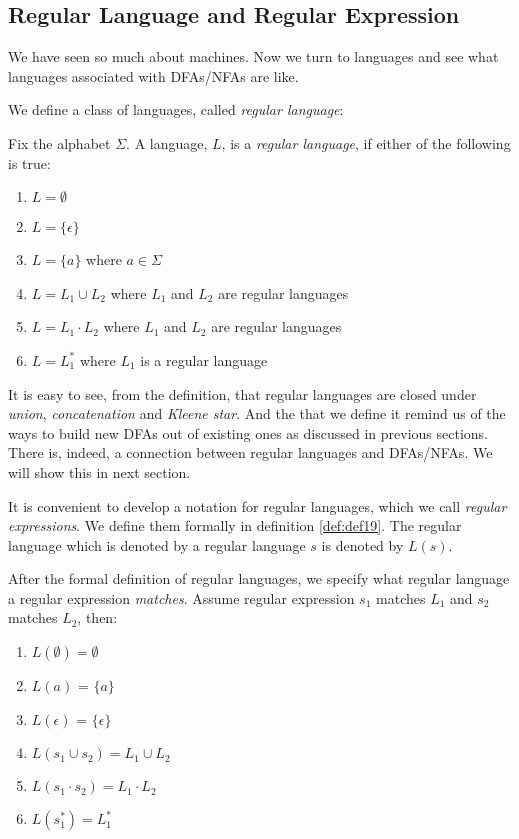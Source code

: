 \documentclass[11pt]{article}
\begin{document}
\subsection{Regular Language and Regular Expression}

We have seen so much about machines. Now we turn to languages and see what
languages associated with DFAs/NFAs are like.

We define a class of languages, called \emph{regular language}:
\begin{definition}
Fix the alphabet $\Sigma$. A language, $L$, is a \emph{regular language},
if either of the following is true:
\begin{enumerate}
\item $L = \emptyset$
\item $L = \{\epsilon\}$
\item $L = \{a\}$ where $a \in \Sigma$
\item $L = L_1 \cup L_2$ where $L_1$ and $L_2$ are regular languages
\item $L = L_1 \cdot L_2$ where $L_1$ and $L_2$ are regular languages
\item $L = L_1^\ast$ where $L_1$ is a regular language
\end{enumerate}
\end{definition}

It is easy to see, from the definition, that regular languages are closed
under \emph{union}, \emph{concatenation} and \emph{Kleene star}. And the
that we define it remind us of the ways to build new DFAs out of existing
ones as discussed in previous sections. There is, indeed, a connection
between regular languages and DFAs/NFAs. We will show this in next section.

It is convenient to develop a notation for regular languages, which we
call \emph{regular expressions}. We define them formally in definition
\ref{def:def19}. The regular language which is denoted by a regular
language $s$ is denoted by $L(s)$.

After the formal definition of regular languages, we specify what regular
language a regular expression \emph{matches}. Assume regular expression
$s_1$ matches $L_1$ and $s_2$ matches $L_2$, then:
\begin{enumerate}
\item $L(\emptyset) = \emptyset$
\item $L(a)$ = $\{a\}$
\item $L(\epsilon)$ = $\{\epsilon\}$
\item $L(s_1 \cup s_2) = L_1 \cup L_2$
\item $L(s_1 \cdot s_2) = L_1 \cdot L_2$
\item $L(s_1 ^ \ast) = L_1 ^ \ast$
\end{enumerate}
\end{document}
